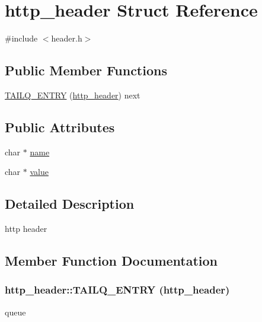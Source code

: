 \hypertarget{structhttp__header}{
\section{http\_\-header Struct Reference}
\label{structhttp__header}
}


{\ttfamily \#include $<$header.h$>$}

\subsection*{Public Member Functions}
\begin{DoxyCompactItemize}
\item 
\hyperlink{structhttp__header_a6c725bf278fd43591fd427f13dd549e7}{TAILQ\_\-ENTRY} (\hyperlink{structhttp__header}{http\_\-header}) next
\end{DoxyCompactItemize}
\subsection*{Public Attributes}
\begin{DoxyCompactItemize}
\item 
char $\ast$ \hyperlink{structhttp__header_a4b8f00a2ee309ded1317bf3a24450d4b}{name}
\item 
char $\ast$ \hyperlink{structhttp__header_a59ba803f544343152011284fd833ec73}{value}
\end{DoxyCompactItemize}


\subsection{Detailed Description}
http header 

\subsection{Member Function Documentation}
\hypertarget{structhttp__header_a6c725bf278fd43591fd427f13dd549e7}{
\subsubsection[{TAILQ\_\-ENTRY}]{\setlength{\rightskip}{0pt plus 5cm}http\_\-header::TAILQ\_\-ENTRY ({\bf http\_\-header})}}
\label{structhttp__header_a6c725bf278fd43591fd427f13dd549e7}
queue 

